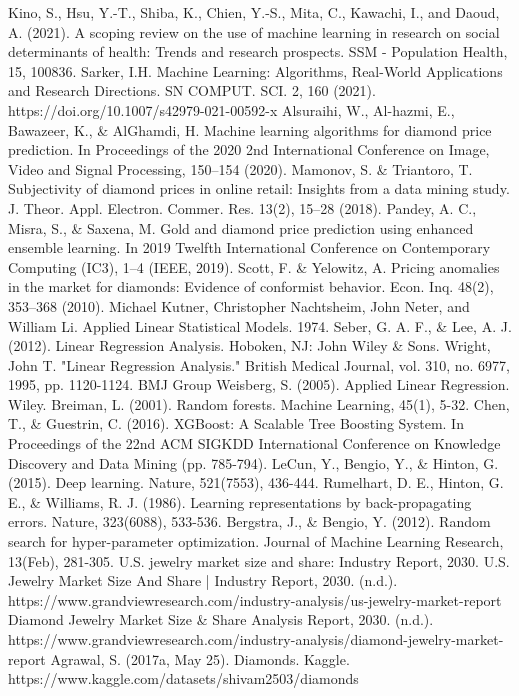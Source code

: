 \documentclass[conference]{IEEEtran}
\begin{document}
\begin{thebibliography}{00}
 Kino, S., Hsu, Y.-T., Shiba, K., Chien, Y.-S., Mita, C., Kawachi, I., and Daoud, A. (2021). A scoping review on the use of machine learning in research on social determinants of health: Trends and research prospects. SSM - Population Health, 15, 100836.
 Sarker, I.H. Machine Learning: Algorithms, Real-World Applications and Research Directions. SN COMPUT. SCI. 2, 160 (2021). https://doi.org/10.1007/s42979-021-00592-x
 Alsuraihi, W., Al-hazmi, E., Bawazeer, K., \& AlGhamdi, H. Machine learning algorithms for diamond price prediction. In Proceedings of the 2020 2nd International Conference on Image, Video and Signal Processing, 150–154 (2020).
 Mamonov, S. \& Triantoro, T. Subjectivity of diamond prices in online retail: Insights from a data mining study. J. Theor. Appl. Electron. Commer. Res. 13(2), 15–28 (2018).
 Pandey, A. C., Misra, S., \& Saxena, M. Gold and diamond price prediction using enhanced ensemble learning. In 2019 Twelfth International Conference on Contemporary Computing (IC3), 1–4 (IEEE, 2019).
 Scott, F. \& Yelowitz, A. Pricing anomalies in the market for diamonds: Evidence of conformist behavior. Econ. Inq. 48(2), 353–368 (2010).
Michael Kutner, Christopher Nachtsheim, John Neter, and William Li. Applied Linear Statistical Models. 1974.
Seber, G. A. F., \& Lee, A. J. (2012). Linear Regression Analysis. Hoboken, NJ: John Wiley \& Sons.
 Wright, John T. "Linear Regression Analysis." British Medical Journal, vol. 310, no. 6977, 1995, pp. 1120-1124. BMJ Group
 Weisberg, S. (2005). Applied Linear Regression. Wiley.
 Breiman, L. (2001). Random forests. Machine Learning, 45(1), 5-32.
 Chen, T., \& Guestrin, C. (2016). XGBoost: A Scalable Tree Boosting System. In Proceedings of the 22nd ACM SIGKDD International Conference on Knowledge Discovery and Data Mining (pp. 785-794).
 LeCun, Y., Bengio, Y., \& Hinton, G. (2015). Deep learning. Nature, 521(7553), 436-444.
 Rumelhart, D. E., Hinton, G. E., \& Williams, R. J. (1986). Learning representations by back-propagating errors. Nature, 323(6088), 533-536.
 Bergstra, J., \& Bengio, Y. (2012). Random search for hyper-parameter optimization. Journal of Machine Learning Research, 13(Feb), 281-305.
 U.S. jewelry market size and share: Industry Report, 2030. U.S. Jewelry Market Size And Share | Industry Report, 2030. (n.d.). https://www.grandviewresearch.com/industry-analysis/us-jewelry-market-report
 Diamond Jewelry Market Size \& Share Analysis Report, 2030. (n.d.). https://www.grandviewresearch.com/industry-analysis/diamond-jewelry-market-report
 Agrawal, S. (2017a, May 25). Diamonds. Kaggle. https://www.kaggle.com/datasets/shivam2503/diamonds
\end{thebibliography}
\vspace{12pt}
\end{document}
